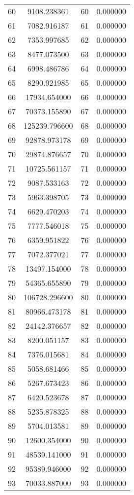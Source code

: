 \documentclass[12pt]{article}
\begin{document}
\begin{longtable}{@{}cccc@{}}
60 & 9108.238361 & 60 & 0.000000 \\
61 & 7082.916187 & 61 & 0.000000 \\
62 & 7353.997685 & 62 & 0.000000 \\
63 & 8477.073500 & 63 & 0.000000 \\
64 & 6998.486786 & 64 & 0.000000 \\
65 & 8290.921985 & 65 & 0.000000 \\
66 & 17934.654000 & 66 & 0.000000 \\
67 & 70373.155890 & 67 & 0.000000 \\
68 & 125239.796600 & 68 & 0.000000 \\
69 & 92878.973178 & 69 & 0.000000 \\
70 & 29874.876657 & 70 & 0.000000 \\
71 & 10725.561157 & 71 & 0.000000 \\
72 & 9087.533163 & 72 & 0.000000 \\
73 & 5963.398705 & 73 & 0.000000 \\
74 & 6629.470203 & 74 & 0.000000 \\
75 & 7777.546018 & 75 & 0.000000 \\
76 & 6359.951822 & 76 & 0.000000 \\
77 & 7072.377021 & 77 & 0.000000 \\
78 & 13497.154000 & 78 & 0.000000 \\
79 & 54365.655890 & 79 & 0.000000 \\
80 & 106728.296600 & 80 & 0.000000 \\
81 & 80966.473178 & 81 & 0.000000 \\
82 & 24142.376657 & 82 & 0.000000 \\
83 & 8200.051157 & 83 & 0.000000 \\
84 & 7376.015681 & 84 & 0.000000 \\
85 & 5058.681466 & 85 & 0.000000 \\
86 & 5267.673423 & 86 & 0.000000 \\
87 & 6420.523678 & 87 & 0.000000 \\
88 & 5235.878325 & 88 & 0.000000 \\
89 & 5704.013581 & 89 & 0.000000 \\
90 & 12600.354000 & 90 & 0.000000 \\
91 & 48539.141000 & 91 & 0.000000 \\
92 & 95389.946000 & 92 & 0.000000 \\
93 & 70033.887000 & 93 & 0.000000 \\

\end{longtable}
\end{document}
